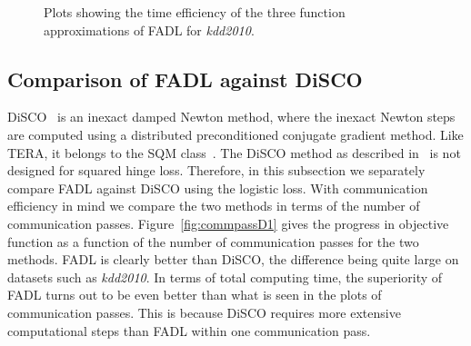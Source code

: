 \documentclass[twoside, 11pt]{article}
\begin{document}
\begin{figure}[t]
\centering
{}

\caption{Plots showing the time efficiency of the three function approximations of FADL for {\it kdd2010}.}
\label{fig:ipm}
\end{figure}


\subsection{Comparison of FADL against DiSCO}
\label{subsec:discocomp}

DiSCO~\citep{discoicml} is an inexact damped Newton method, where the inexact Newton steps are computed using a distributed preconditioned conjugate gradient method. Like TERA, it belongs to the SQM class~\citep{chu2006}. The DiSCO method as described in~\citet{discoicml} is not designed for squared hinge loss. Therefore, in this subsection we separately compare FADL against DiSCO using the logistic loss. With communication efficiency in mind we compare the two methods in terms of the number of communication passes. Figure~\ref{fig:commpassD1} gives the progress in objective function as a function of the number of communication passes for the two methods. FADL is clearly better than DiSCO, the difference being quite large on datasets such as {\it kdd2010}. In terms of total computing time, the superiority of FADL turns out to be even better than what is seen in the plots of communication passes. This is because DiSCO requires more extensive computational steps than FADL within one communication pass.
\end{document}
